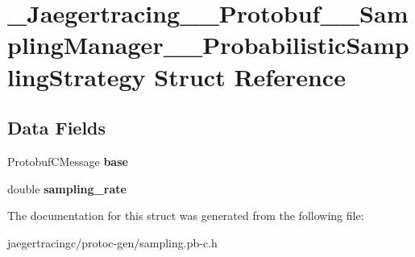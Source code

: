 \hypertarget{struct__Jaegertracing____Protobuf____SamplingManager____ProbabilisticSamplingStrategy}{}\section{\+\_\+\+Jaegertracing\+\_\+\+\_\+\+Protobuf\+\_\+\+\_\+\+Sampling\+Manager\+\_\+\+\_\+\+Probabilistic\+Sampling\+Strategy Struct Reference}
\label{struct__Jaegertracing____Protobuf____SamplingManager____ProbabilisticSamplingStrategy}
\subsection*{Data Fields}
\begin{DoxyCompactItemize}
\item 
\mbox{\label{struct__Jaegertracing____Protobuf____SamplingManager____ProbabilisticSamplingStrategy_a4354f095f0e49c79abfbc7f786be6b41}} 
Protobuf\+C\+Message {\bfseries base}
\item 
\mbox{\label{struct__Jaegertracing____Protobuf____SamplingManager____ProbabilisticSamplingStrategy_a191605c4af2a8294cefe0c50573fc4c7}} 
double {\bfseries sampling\+\_\+rate}
\end{DoxyCompactItemize}


The documentation for this struct was generated from the following file\+:\begin{DoxyCompactItemize}
\item 
jaegertracingc/protoc-\/gen/sampling.\+pb-\/c.\+h\end{DoxyCompactItemize}
